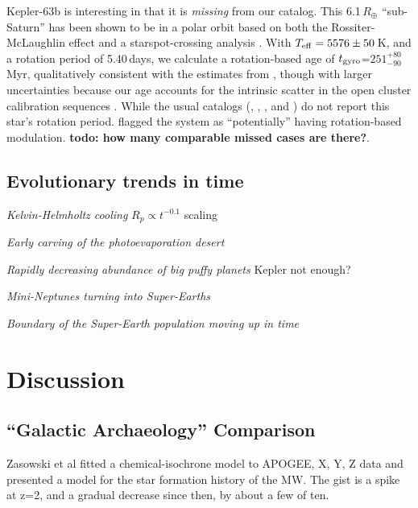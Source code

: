 \documentclass[11pt,twocolumn,tighten]{aastex63}
\begin{document}
Kepler-63b is interesting in that it is {\it missing} from our
catalog.  This 6.1\,$R_\oplus$ ``sub-Saturn'' has been shown to be in
a polar orbit based on both the Rossiter-McLaughlin effect and a
starspot-crossing analysis \citep{2013ApJ...775...54S}.  With $T_{\rm
eff}=5576\pm50$\,K, and a rotation period of 5.40\,days, we calculate
a rotation-based age of $t_{\rm gyro}$=$251^{+80}_{-90}$\,Myr,
qualitatively consistent with the estimates from
\citet{2013ApJ...775...54S}, though with larger uncertainties because
our age accounts for the intrinsic scatter in the open cluster
calibration sequences \citep{Bouma_2023}.  
While the usual catalogs (,
, , and
) do not report this star's rotation period.
 flagged the system as ``potentially'' having
rotation-based modulation.
{\bf todo: how many comparable missed cases are there?}.
%





\subsection{Evolutionary trends in time}

{\it Kelvin-Helmholtz cooling}
$R_p \propto t^{-0.1}$ scaling \citep{Gupta_2019}

{\it Early carving of the photoevaporation desert}
\citep{Owen_Lai_2018}

{\it Rapidly decreasing abundance of big puffy planets}
Kepler not enough?

{\it Mini-Neptunes turning into Super-Earths}
\citep[e.g.][]{Rogers_2021}

{\it Boundary of the Super-Earth population moving up in time}
\citep{David_2021}


\section{Discussion}
\label{sec:disc}

\subsection{``Galactic Archaeology'' Comparison}
Zasowski et al fitted a chemical-isochrone model to APOGEE, X, Y, Z
data and presented a model for the star formation history of the MW.
The gist is a spike at z=2, and a gradual decrease since then, by
about a few of ten.
\end{document}
